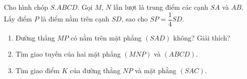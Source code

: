 \begin{bt}%
    Cho hình chóp $S.ABCD$. Gọi $M$, $N$ lần lượt là trung điểm các cạnh $SA$ và $AB$. Lấy điểm $P$ là điểm nằm trên cạnh $SD$, sao cho $SP=\dfrac{1}{4}SD$.
    \begin{enumerate}
        \item Đường thẳng $MP$ có nằm trên mặt phẳng $(SAD)$ không? Giải thích?
        \item Tìm giao tuyến của hai mặt phẳng $(MNP)$ và $(ABCD)$.
        \item Tìm giao điểm $K$ của đường thẳng $NP$ và mặt phằng $(SAC)$.
    \end{enumerate}
    

\end{bt}
